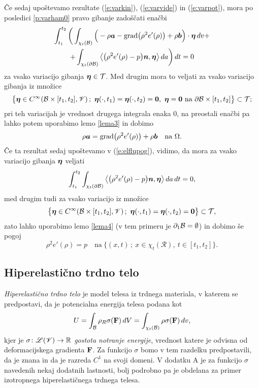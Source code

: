 Če sedaj upoštevamo rezultate (\ref{e:varkin}), (\ref{e:varvide}) in (\ref{e:varpot}),
mora po posledici \ref{p:varham0} pravo gibanje zadoščati enačbi
\begin{multline} \label{e:elflupog}
	\int_{t_1}^{t_2}\bigg( \int_{\chi_t(\mathcal B)}\Big(-\rho\boldsymbol a-
	\mathrm{grad}\big(\rho^2 e'(\rho)\big)+\rho\boldsymbol b\Big)\cdot\boldsymbol \eta\,dv+ \\
	+\int_{\chi_t(\partial \mathcal B)}\big<\big(\rho^2 e'(\rho)-p\big)\boldsymbol n,\boldsymbol \eta\big>\,da\bigg)\,dt=0
\end{multline}
za vsako variacijo gibanja $\boldsymbol \eta\in\mathcal{T}$. Med drugim mora to veljati za
vsako variacijo gibanja iz množice
\[
	\big\{ \vek{\eta}\in C^{\infty}(\B\times[t_1,t_2],\V)\,;\ \vek{\eta}(\cdot,t_1)=
	\vek{\eta}(\cdot,t_2)=\vek{0},\ \vek{\eta}=\vek{0}\ \textrm{na}\ \partial \B\times[t_1,t_2]
	\big\}\subset\mathcal{T};
\]
pri teh variacijah je vrednost drugega integrala enaka 0, na preostali enačbi
pa lahko potem uporabimo lemo \ref{lema3} in dobimo
\begin{equation*}
	\rho\boldsymbol a=\mathrm{grad}\big(\rho^2 e'(\rho)\big)+\rho\boldsymbol b\quad
	\textrm{na}\ \Omega.
\end{equation*}
Če ta rezultat sedaj upoštevamo v (\ref{e:elflupog}), vidimo, da mora
za vsako variacijo gibanja $\boldsymbol \eta$ veljati
\[
	\int_{t_1}^{t_2}\int_{\chi_t(\partial \mathcal B)}\big<\big(\rho^2 e'(\rho)-p\big)\boldsymbol n,\boldsymbol \eta\big>\,da\,dt=0,
\]
med drugim tudi za vsako variacijo iz množice
\[
	\big\{ \vek{\eta}\in C^{\infty}(\B\times[t_1,t_2],\V)\,;\ \vek{\eta}(\cdot,t_1)=
	\vek{\eta}(\cdot,t_2)=\vek{0} \big\}\subset\mathcal{T},
\]
zato lahko uporabimo lemo \ref{lema4} (v tem primeru je $\partial_1\mathcal B=\emptyset$) in dobimo še pogoj
\[
	\rho^2 e'(\rho)=p \quad\textrm{na}\ \{ (x,t)\,;\ x\in\chi_t(\mathcal{R}),\ t\in[t_1,t_2] \}.
\]


\subsection{Hiperelastično trdno telo}


\emph{Hiperelastično trdno telo} je model telesa iz trdnega materiala, v katerem se predpostavi,
da je potencialna energija telesa podana kot
\[ U=\int_{\mathcal B}\rho_R \sigma(\mathbf F)\,dV=\int_{\chi_t(\mathcal B)}\rho\sigma(\mathbf F)\,dv, \]
kjer je $\sigma\colon\mathscr L(\mathscr V)\to\mathbb R$ \emph{gostota notranje energije}, vrednost katere je odvisna od
deformacijskega gradienta $\mathbf F$. Za funkcijo $\sigma$ bomo v tem razdelku predpostavili, da je znana in da je
razreda $C^1$ na svoji domeni. V dodatku A je za funkcijo $\sigma$ navedenih nekaj dodatnih lastnosti,
bolj podrobno pa je obdelana za primer izotropnega hiperelastičnega trdnega telesa.

